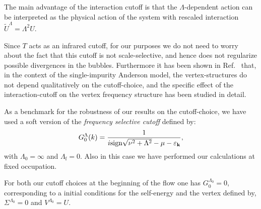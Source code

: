 The main advantage of the interaction cutoff is that  the $\Lambda$-dependent action can be interpreted\cite{Honerkamp2004} as the physical action of the system with rescaled interaction $\tilde{U}^\Lambda = \Lambda^2 U$.

Since $T$ acts as an infrared cutoff, for our purposes we do not need to worry about the fact that this cutoff is not scale-selective, and hence does not regularize possible divergences in the bubbles. 
Furthermore it has been shown in Ref.~ that, in the context of the single-impurity Anderson model, the vertex-structures do not depend qualitatively on the cutoff-choice, and the specific effect of the interaction-cutoff on the vertex frequency structure has been studied in detail.  

As a benchmark for the robustness of our results on the cutoff-choice, we have used a soft version of the \textit{frequency selective cutoff} defined\cite{Eberlein2014} by:
\begin{equation}
G_0^\Lambda(k) = \frac{1}{i\mathrm{sign}\sqrt{\nu^2+\Lambda^2 }-\mu- \varepsilon_{\mathbf{k}}},  
\end{equation}  
with $\Lambda_0=\infty$ and $\Lambda_{\mathrm{f}}=0$. Also in this case we have performed our calculations at fixed occupation. 


For both our cutoff choices at the beginning of the flow one has $G_0^{\Lambda_0}=0$, corresponding to a initial conditions for the self-energy and the vertex  defined by, $\Sigma^{\Lambda_0}=0$ and $V^{\Lambda_0 }= U$. 
   
